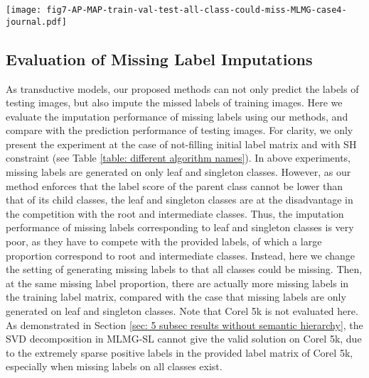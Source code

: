 \documentclass[twocolumn]{svjour3}          %
\begin{document}
\begin{figure*}[!tbh]
\centering
\texttt{[image: fig7-AP-MAP-train-val-test-all-class-could-miss-MLMG-case4-journal.pdf]}
\caption{Average precision (\textbf{top}) and mAP (\textbf{bottom}) results of our proposed methods on evaluation of missing label imputations. Please see Section \ref{sec: 5 subsec evaluation of missing imputation} for details. Figure better viewed on screen.}
\label{fig: AP and MAP results on all classes could be missing}
\end{figure*}

\subsection{Evaluation of Missing Label Imputations}
\label{sec: 5 subsec evaluation of missing imputation}

As transductive models, our proposed methods can not only predict the labels of testing images, but also impute the missed labels of training images. 
Here we evaluate the imputation performance of missing labels using our methods, and compare with the prediction performance of testing images. 
For clarity, we only present the experiment at the case of not-filling initial label matrix and with SH constraint (see Table \ref{table: different algorithm names}). 
%
In above experiments, missing labels are generated on only leaf and singleton classes. However, as our method enforces that the label score of the parent class cannot be lower than that of its child classes, the leaf and singleton classes are at the disadvantage in the competition with the root and intermediate classes. Thus, the imputation performance of missing labels corresponding to leaf and singleton classes is very poor, as they have to compete with the provided labels, of which a large proportion correspond to root and intermediate classes. 
Instead, here we change the setting of generating missing labels to that all classes could be missing. Then, at the same missing label proportion, there are actually more missing labels in the training label matrix, compared with the case that missing labels are only generated on leaf and singleton classes. 
%
Note that Corel 5k is not evaluated here. As demonstrated in Section \ref{sec: 5 subsec results without semantic hierarchy}, the SVD decomposition in MLMG-SL cannot give the valid solution on Corel 5k, due to the extremely sparse positive labels in the provided label matrix of Corel 5k, especially when missing labels on all classes exist. 
\end{document}
